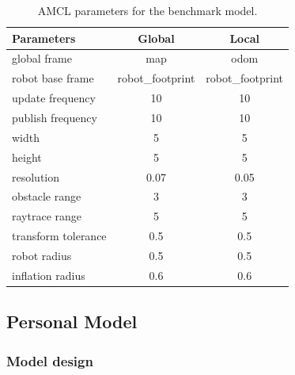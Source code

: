 \documentclass[10pt,journal,compsoc]{IEEEtran}
\begin{document}
\begin{table}[ht]
\caption{AMCL parameters for the benchmark model.}
\label{tab:costmapParam-Udacitybot}
\begin{center}
    \begin{tabular}{lcc}
        \toprule%
\textbf{Parameters} & \textbf{Global}  & \textbf{Local}   \\
\midrule
global frame        & map              & odom             \\
robot base frame    & robot\_footprint & robot\_footprint \\
update frequency    & 10               & 10               \\
publish frequency   & 10               & 10               \\
width               & 5                & 5                \\
height              & 5                & 5                \\
resolution          & 0.07             & 0.05             \\
obstacle range      & 3                & 3                \\
raytrace range      & 5                & 5                \\
transform tolerance & 0.5              & 0.5              \\
robot radius        & 0.5              & 0.5              \\
inflation radius    & 0.6              & 0.6             \\
    \bottomrule%
\end{tabular}
\end{center}
\end{table}

\subsection{Personal Model}
\subsubsection{Model design}
\end{document}
